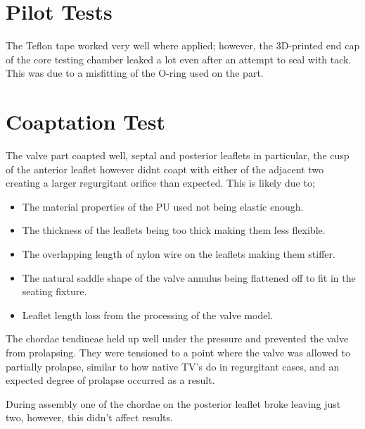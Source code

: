 \section{Pilot Tests}
The Teflon tape worked very well where applied; however, the 3D-printed end cap of the core testing chamber leaked a lot even after an attempt to seal with tack. This was due to a misfitting of the O-ring used on the part.

\section{Coaptation Test}
The valve part coapted well, septal and posterior leaflets in particular, the cusp of the anterior leaflet however didnt coapt with either of the adjacent two creating a larger regurgitant orifice than expected. This is likely due to;
\begin{itemize}
    \item The material properties of the \gls{PU} used not being elastic enough.
    \item The thickness of the leaflets being too thick making them less flexible.
    \item The overlapping length of nylon wire on the leaflets making them stiffer.
    \item The natural saddle shape of the valve annulus being flattened off to fit in the seating fixture.
    \item Leaflet length loss from the processing of the valve model.
\end{itemize}

The chordae tendineae held up well under the pressure and prevented the valve from prolapsing. They were tensioned to a point where the valve was allowed to partially prolapse, similar to how native \gls{TV}'s do in regurgitant cases, and an expected degree of prolapse occurred as a result.

During assembly one of the chordae on the posterior leaflet broke leaving just two, however, this didn't affect results.

